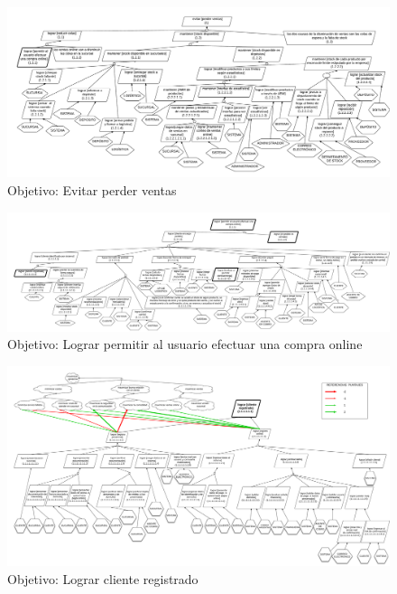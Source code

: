 \begin{figure}[H]\begin{center}
  \includegraphics[angle=90,height=.9\textheight]{tp1/images/objetivos-raiz.pdf}
  \caption{Objetivo: Evitar perder ventas}
\end{center}\end{figure}

\begin{figure}[H]\begin{center}
  \includegraphics[angle=90,height=.9\textheight]{tp1/images/objetivos-operacion-online.pdf}
  \caption{Objetivo: Lograr permitir al usuario efectuar una compra online}
\end{center}\end{figure}

\begin{figure}[H]\begin{center}
  \includegraphics[angle=90,height=.9\textheight]{tp1/images/objetivos-cliente-registrado.pdf}
  \caption{Objetivo: Lograr cliente registrado}
\end{center}\end{figure}

